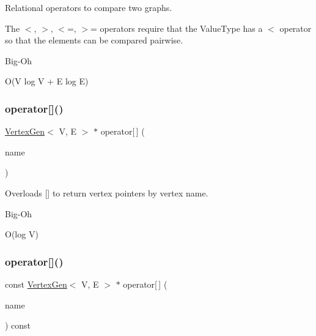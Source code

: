 Relational operators to compare two graphs. 

The $<$, $>$, $<$=, $>$= operators require that the Value\+Type has a $<$ operator so that the elements can be compared pairwise. \begin{DoxyRefDesc}{Big-\/\+Oh}
\item[\mbox{\hyperlink{BigOh__BigOh000098}{Big-\/\+Oh}}]O(V log V + E log E) \end{DoxyRefDesc}
\mbox{\label{classBasicGraphGen_a5e874dbb2f9f2c7f98ec74f00790eb0e}} 
\subsubsection{\texorpdfstring{operator[]()}{operator[]()}\hspace{0.1cm}{\footnotesize\ttfamily [1/2]}}
{\footnotesize\ttfamily \mbox{\hyperlink{classVertexGen}{Vertex\+Gen}}$<$ V, E $>$ $\ast$ operator\mbox{[}$\,$\mbox{]} (\begin{DoxyParamCaption}\item[{const std\+::string \&}]{name }\end{DoxyParamCaption})}



Overloads {\ttfamily \mbox{[}\mbox{]}} to return vertex pointers by vertex name. 

\begin{DoxyRefDesc}{Big-\/\+Oh}
\item[\mbox{\hyperlink{BigOh__BigOh000038}{Big-\/\+Oh}}]O(log V) \end{DoxyRefDesc}
\mbox{\label{classBasicGraphGen_ad91a5b6ebd034841cf4f4c410fb7ed1b}} 
\subsubsection{\texorpdfstring{operator[]()}{operator[]()}\hspace{0.1cm}{\footnotesize\ttfamily [2/2]}}
{\footnotesize\ttfamily const \mbox{\hyperlink{classVertexGen}{Vertex\+Gen}}$<$ V, E $>$ $\ast$ operator\mbox{[}$\,$\mbox{]} (\begin{DoxyParamCaption}\item[{const std\+::string \&}]{name }\end{DoxyParamCaption}) const}



